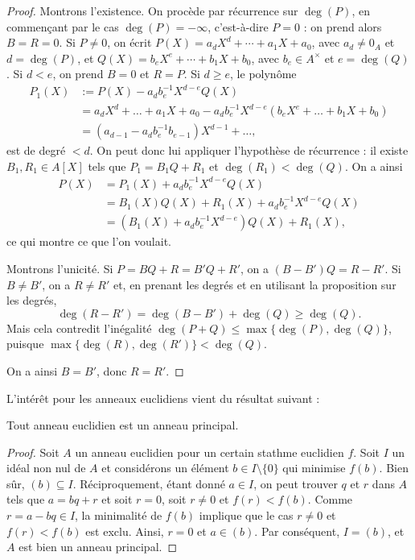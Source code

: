 \documentclass[]{report}
\begin{document}
\begin{proof}
    Montrons l'existence. On procède par récurrence sur $\deg(P)$, en commençant par le cas $\deg(P) = -\infty$, c'est-à-dire $P = 0$ : on prend alors $B = R = 0$. Si $P \neq 0$, on écrit $P(X) = a_d X^d + \cdots + a_1 X + a_0$, avec $a_d \neq 0_A$ et $d = \deg(P)$, et $Q(X) = b_e X^e + \cdots + b_1 X + b_0$, avec $b_e \in A^{\times}$ et $e = \deg(Q)$. Si $d < e$, on prend $B = 0$ et $R = P$. Si $d \ge e$, le polynôme
    \begin{align*}
    P_1(X) & := P(X) - a_d b_e^{-1} X^{d-e} Q(X)\\
    & = a_d X^d + \dots + a_1 X + a_0 - a_d b_e^{-1} X^{d-e} (b_e X^e + \dots + b_1 X + b_0)\\
    & = (a_{d-1} - a_d b_e^{-1} b_{e-1}) X^{d-1} + \dots,
    \end{align*}
    est de degré $< d$. On peut donc lui appliquer l'hypothèse de récurrence : il existe $B_1, R_1 \in A[X]$ tels que $P_1 = B_1 Q + R_1$ et $\deg(R_1) < \deg(Q)$. On a ainsi
    \begin{align*}
    P(X) & = P_1(X) + a_d b_e^{-1} X^{d-e} Q(X)\\
    & = B_1(X) Q(X) + R_1(X) + a_d b_e^{-1} X^{d-e} Q(X)\\
    & = (B_1(X) + a_d b_e^{-1} X^{d-e}) Q(X) + R_1(X),
    \end{align*}
    ce qui montre ce que l'on voulait.

    Montrons l'unicité. Si $P = BQ + R = B'Q + R'$, on a $(B - B')Q = R - R'$. Si $B \neq B'$, on a $R \neq R'$ et, en prenant les degrés et en utilisant la proposition sur les degrés,
    \[\deg(R - R') = \deg(B - B') + \deg(Q) \ge \deg(Q).\]
    Mais cela contredit l'inégalité $\deg(P + Q) \le \max\{\deg(P), \deg(Q)\}$, puisque $\max\{\deg(R), \deg(R')\} < \deg(Q)$.

    On a ainsi $B = B'$, donc $R = R'$.
\end{proof}

L'intérêt pour les anneaux euclidiens vient du résultat suivant :

\begin{tm}{}{}
    Tout anneau euclidien est un anneau principal.
\end{tm}

\begin{proof}
    Soit $A$ un anneau euclidien pour un certain stathme euclidien $f$. Soit $I$ un idéal non nul de $A$ et considérons un élément $b \in I \setminus \{0\}$ qui minimise $f(b)$. Bien sûr, $(b) \subseteq I$. Réciproquement, étant donné $a \in I$, on peut trouver $q$ et $r$ dans $A$ tels que $a = bq + r$ et soit $r = 0$, soit $r \neq 0$ et $f(r) < f(b)$. Comme $r = a - bq \in I$, la minimalité de $f(b)$ implique que le cas $r \neq 0$ et $f(r) < f(b)$ est exclu. Ainsi, $r = 0$ et $a \in (b)$. Par conséquent, $I = (b)$, et $A$ est bien un anneau principal.
\end{proof}
\end{document}
